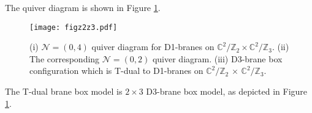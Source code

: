 \documentclass{article}
\numberwithin{equation}{section}
\begin{document}
\begin{comment}
\right)
&
\left(
{D^{(2,1)}}_{(2,2)}{L^{(2,2)}}_{(1,2)}-{L^{(2,1)}}_{(1,1)}{D^{(1,1)}}_{(1,2)}
\right)
\\
\end{smallmatrix}
\right),
\nonumber\\
C_{A\tilde{A}}^{(2,2)}
&=\left(
\begin{smallmatrix}
\left(
{U^{(1,1)}}_{(1,2)}{R^{(1,2)}}_{(2,2)}-{R^{(1,1)}}_{(2,1)}{U^{(2,1)}}_{(2,2)}
\right)
&
\left(
{D^{(2,2)}}_{(2,1)}{R^{(2,1)}}_{(1,1)}-{R^{(2,2)}}_{(1,2)}{D^{(1,2)}}_{(1,1)}
\right)
\\
\left(
{L^{(1,1)}}_{(2,1)}{U^{(2,1)}}_{(2,2)}-{U^{(1,1)}}_{(1,2)}{L^{(1,2)}}_{(2,2)}
\right)
&
\left(
{D^{(2,2)}}_{(2,1)}{L^{(2,1)}}_{(1,1)}-{L^{(2,2)}}_{(1,2)}{D^{(1,2)}}_{(1,1)}
\right)
\\
\end{smallmatrix}
\right),
\nonumber\\
C_{A\tilde{A}}^{(2,3)}
&=\left(
\begin{smallmatrix}
\left(
{U^{(1,2}}_{(1,3)}{R^{(1,3}}_{(2,3)}-{R^{(1,2)}}_{(2,2)}{U^{(2,2)}}_{(2,3)}
\right)
&
\left(
{D^{(2,3)}}_{(2,2)}{R^{(2,2)}}_{(1,2)}-{R^{(2,3)}}_{(1,3)}{D^{(1,3)}}_{(1,2)}
\right)
\\
\left(
{L^{(1,2)}}_{(2,2)}{U^{(2,2)}}_{(2,3)}-{U^{(1,2)}}_{(1,3)}{L^{(1,3)}}_{(2,3)}
\right)
&
\left(
{D^{(2,3)}}_{(2,2)}{L^{(2,2}}_{(1,2)}-{L^{(2,3)}}_{(1,3)}{D^{(1,3)}}_{(1,2)}
\right)
\\
\end{smallmatrix}
\right). 
\end{align}
Hence the $\mathcal{N}=(0,4)$ potential is given by 
\begin{align}
\label{04_pot_z2z2}
V&=\frac18 \sum_{i_1 =1}^{2}\sum_{i_2=1}^{3}
\epsilon^{AB}\epsilon^{\tilde{A}\tilde{B}}
C_{A\tilde{A}}^{(i_1, i_2)}C_{B\tilde{B}}^{(i_1,i_2)}. 
\end{align}




\end{comment}









The quiver diagram is shown in Figure \ref{figz2z3}. 
\begin{figure}
\begin{center}
\texttt{[image: figz2z3.pdf]}
\caption{
(i) $\mathcal{N}=(0,4)$ quiver diagram for D1-branes on $\mathbb{C}^{2}/\mathbb{Z}_{2}\times \mathbb{C}^{2}/\mathbb{Z}_{3}$. 
(ii) The corresponding $\mathcal{N}=(0,2)$ quiver diagram. 
(iii) D3-brane box configuration which is T-dual to D1-branes on 
$\mathbb{C}^{2}/\mathbb{Z}_{2}$ $\times$ $\mathbb{C}^{2}/\mathbb{Z}_{3}$. }
\label{figz2z3}
\end{center}
\end{figure}
The T-dual brane box model is $2\times 3$ D3-brane box model, 
as depicted in Figure \ref{figz2z3}. 
\end{document}
